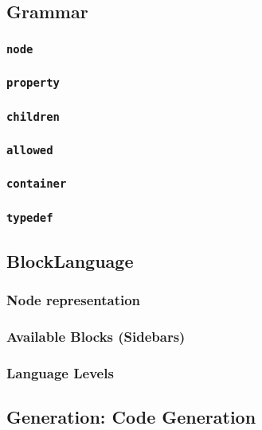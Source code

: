 \subsection{Grammar}

\subsubsection{\texttt{node}}

\subsubsection{\texttt{property}}

\subsubsection{\texttt{children}}

\subsubsection{\texttt{allowed}}

\subsubsection{\texttt{container}}

\subsubsection{\texttt{typedef}}

\subsection{BlockLanguage}

\subsubsection{Node representation}

\subsubsection{Available Blocks (Sidebars)}

\subsubsection{Language Levels}

\subsection{Generation: Code Generation}

